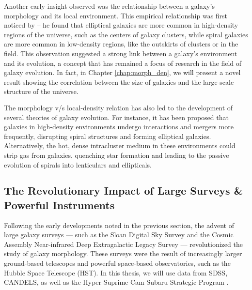 Another early insight observed was the relationship between a galaxy's morphology and its local environment. This empirical relationship was first noticed by \citet{dressler_84} -- he found that elliptical galaxies are more common in high-density regions of the universe, such as the centers of galaxy clusters, while spiral galaxies are more common in low-density regions, like the outskirts of clusters or in the field. This observation suggested a strong link between a galaxy's environment and its evolution, a concept that has remained a focus of research in the field of galaxy evolution. In fact, in Chapter \ref{chap:morph_den}, we will present a novel result showing the correlation between the size of galaxies and the large-scale structure of the universe. 

The morphology v/s local-density relation has also led to the development of several theories of galaxy evolution. For instance, it has been proposed that galaxies in high-density environments undergo interactions and mergers more frequently, disrupting spiral structures and forming elliptical galaxies. Alternatively, the hot, dense intracluster medium in these environments could strip gas from galaxies, quenching star formation and leading to the passive evolution of spirals into lenticulars and ellipticals.

\subsection{The Revolutionary Impact of Large Surveys \& Powerful Instruments} \label{sec_intro:large_surveys}

Following the early developments noted in the previous section, the advent of large galaxy surveys --- such as the Sloan Digital Sky Survey \citep[SDSS; ][]{sdss_tech_summary} and the Cosmic Assembly Near-infrared Deep Extragalactic Legacy Survey \citep[CANDELS; ][]{candels_1} --- revolutionized the study of galaxy morphology. These surveys were the result of increasingly larger ground-based telescopes and powerful space-based observatories, such as the Hubble Space Telescope (HST). In this thesis, we will use data from SDSS, CANDELS, as well as the Hyper Suprime-Cam Subaru Strategic Program \citep[HSC-SSP; ][]{hsc_design}. 

